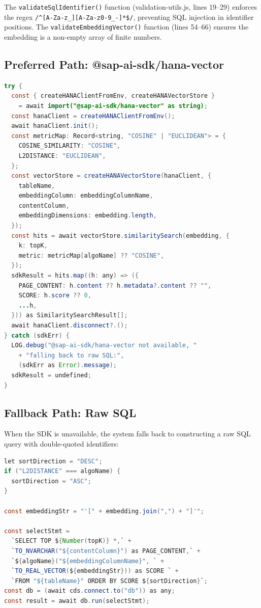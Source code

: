 \documentclass[11pt]{article}
\begin{document}
The \texttt{validateSqlIdentifier()} function (validation-utils.js, lines 19--29)
enforces the regex \texttt{/\^{}[A-Za-z\_][A-Za-z0-9\_-]*\$/}, preventing SQL
injection in identifier positions. The \texttt{validateEmbeddingVector()} function
(lines 54--66) ensures the embedding is a non-empty array of finite numbers.

\subsection{Preferred Path: @sap-ai-sdk/hana-vector}

\begin{lstlisting}[language=Java,caption={HANAVectorStore SDK path --- lines 690--726}]
try {
  const { createHANAClientFromEnv, createHANAVectorStore }
    = await import("@sap-ai-sdk/hana-vector" as string);
  const hanaClient = createHANAClientFromEnv();
  await hanaClient.init();
  const metricMap: Record<string, "COSINE" | "EUCLIDEAN"> = {
    COSINE_SIMILARITY: "COSINE",
    L2DISTANCE: "EUCLIDEAN",
  };
  const vectorStore = createHANAVectorStore(hanaClient, {
    tableName,
    embeddingColumn: embeddingColumnName,
    contentColumn,
    embeddingDimensions: embedding.length,
  });
  const hits = await vectorStore.similaritySearch(embedding, {
    k: topK,
    metric: metricMap[algoName] ?? "COSINE",
  });
  sdkResult = hits.map((h: any) => ({
    PAGE_CONTENT: h.content ?? h.metadata?.content ?? "",
    SCORE: h.score ?? 0,
    ...h,
  })) as SimilaritySearchResult[];
  await hanaClient.disconnect?.();
} catch (sdkErr) {
  LOG.debug("@sap-ai-sdk/hana-vector not available, "
    + "falling back to raw SQL:",
    (sdkErr as Error).message);
  sdkResult = undefined;
}
\end{lstlisting}

\subsection{Fallback Path: Raw SQL}

When the SDK is unavailable, the system falls back to constructing a raw SQL
query with double-quoted identifiers:

\begin{lstlisting}[language=Java,caption={Raw SQL fallback --- lines 728--748}]
let sortDirection = "DESC";
if ("L2DISTANCE" === algoName) {
  sortDirection = "ASC";
}

const embeddingStr = "'[" + embedding.join(",") + "]'";

const selectStmt =
  `SELECT TOP ${Number(topK)} *,` +
  `TO_NVARCHAR("${contentColumn}") as PAGE_CONTENT,` +
  `${algoName}("${embeddingColumnName}", ` +
  `TO_REAL_VECTOR(${embeddingStr})) as SCORE ` +
  `FROM "${tableName}" ORDER BY SCORE ${sortDirection}`;
const db = (await cds.connect.to("db")) as any;
const result = await db.run(selectStmt);
\end{lstlisting}
\end{document}
